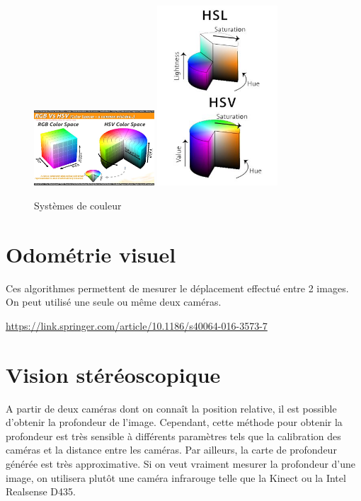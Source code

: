\documentclass[a4paper, 11pt]{report}
\begin{document}
\begin{figure}[h!]
\begin{centering}
\includegraphics[width=0.4\textwidth]{images/RGB_HSV.jpg}
\includegraphics[width=0.4\textwidth]{images/HSL_HSV.jpg}
\caption{Systèmes de couleur}
\par\end{centering}
\end{figure}

\section{Odométrie visuel}
Ces algorithmes permettent de mesurer le déplacement effectué entre 2 images. On peut utilisé une seule ou même deux caméras.

\url{https://link.springer.com/article/10.1186/s40064-016-3573-7}

\section{Vision stéréoscopique}
A partir de deux caméras dont on connaît la position relative, il est possible d'obtenir la profondeur de l'image. Cependant, cette méthode pour obtenir la profondeur est très sensible à différents paramètres tels que la calibration des caméras et la distance entre les caméras. Par ailleurs, la carte de profondeur générée est très approximative. Si on veut vraiment mesurer la profondeur d'une image, on utilisera plutôt une caméra infrarouge telle que la Kinect ou la Intel Realsense D435.
\end{document}
